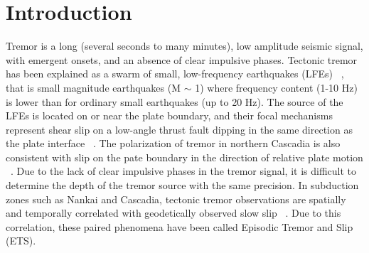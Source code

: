 \documentclass[draft]{agujournal2019}
\begin{document}

%
%
%
%


\section{Introduction}

Tremor is a long (several seconds to many minutes), low amplitude seismic signal, with emergent onsets, and an absence of clear impulsive phases. Tectonic tremor has been explained as a swarm of small, low-frequency earthquakes (LFEs) ~\cite{SHE_2007_nature}, that is small magnitude earthquakes (M $\sim$ 1) where frequency content (1-10 Hz) is lower than for ordinary small earthquakes (up to 20 Hz). The source of the LFEs is located on or near the plate boundary, and their focal mechanisms represent shear slip on a low-angle thrust fault dipping in the same direction as the plate interface ~\cite{IDE_2007_GRL, ROY_2014}. The polarization of tremor in northern Cascadia is also consistent with slip on the pate boundary in the direction of relative plate motion ~\cite{WEC_2007}.  Due to the lack of clear impulsive phases in the tremor signal, it is difficult to determine the depth of the tremor source with the same precision. In subduction zones such as Nankai and Cascadia, tectonic tremor observations are spatially and temporally correlated with geodetically observed slow slip  ~\cite{OBA_2002, ROG_2003}. Due to this correlation, these paired phenomena have been called Episodic Tremor and Slip (ETS). \\
\end{document}

